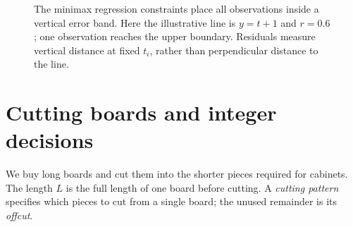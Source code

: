\documentclass[11pt,a4paper]{article}
\begin{document}
\begin{figure}[H]
  \centering
  \caption{The minimax regression constraints place all observations inside a
    vertical error band. Here the illustrative line is $y=t+1$ and $r=0.6$;
    one observation reaches the upper boundary. Residuals measure vertical distance
    at fixed $t_i$, rather than perpendicular distance to the line.}\label{fig:regression}
\end{figure}


\section{Cutting boards and integer decisions}\label{sec:cutting}
We buy long boards and cut them into the shorter pieces required for cabinets.
The length $L$ is the full length of one board before cutting.
A \emph{cutting pattern} specifies which pieces to cut from a single board;
the unused remainder is its \emph{offcut}.
\end{document}
